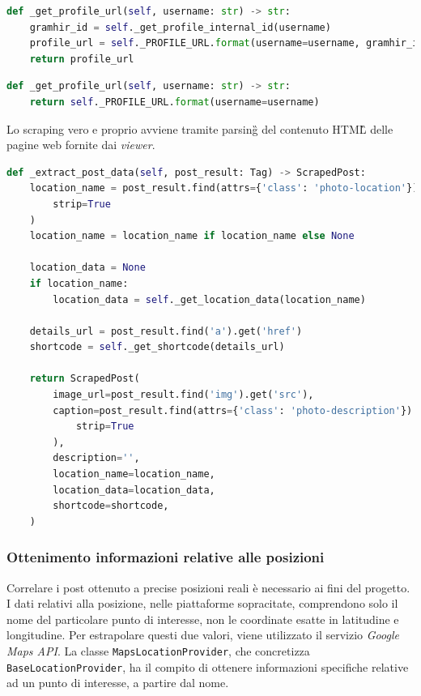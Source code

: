 \begin{lstlisting}[language=Python, caption=Ottenimento URL profilo in \textit{Gramhir}]
def _get_profile_url(self, username: str) -> str:
    gramhir_id = self._get_profile_internal_id(username)
    profile_url = self._PROFILE_URL.format(username=username, gramhir_id=gramhir_id)
    return profile_url
\end{lstlisting}

\begin{lstlisting}[language=Python, caption=Ottenimento URL profilo in \textit{Picuki}]
def _get_profile_url(self, username: str) -> str:
    return self._PROFILE_URL.format(username=username)
\end{lstlisting}

\aCapo{}
Lo scraping vero e proprio avviene tramite parsing\G{} del contenuto HTML\G{} delle pagine web
fornite dai \textit{viewer}.
\begin{lstlisting}[language=Python, caption=Estrazioni dati tramite parsing\G{}]
def _extract_post_data(self, post_result: Tag) -> ScrapedPost:
    location_name = post_result.find(attrs={'class': 'photo-location'}).get_text(
        strip=True
    )
    location_name = location_name if location_name else None

    location_data = None
    if location_name:
        location_data = self._get_location_data(location_name)

    details_url = post_result.find('a').get('href')
    shortcode = self._get_shortcode(details_url)

    return ScrapedPost(
        image_url=post_result.find('img').get('src'),
        caption=post_result.find(attrs={'class': 'photo-description'}).get_text(
            strip=True
        ),
        description='',
        location_name=location_name,
        location_data=location_data,
        shortcode=shortcode,
    )
\end{lstlisting}

\subsubsection{Ottenimento informazioni relative alle posizioni}
Correlare i post ottenuto a precise posizioni reali è necessario ai fini del progetto.
I dati relativi alla posizione, nelle piattaforme sopracitate, comprendono solo il nome del
particolare punto di interesse, non le coordinate esatte in latitudine e longitudine.
Per estrapolare questi due valori, viene utilizzato il servizio \textit{Google Maps API}.\aCapo{}
La classe \verb|MapsLocationProvider|, che concretizza \verb|BaseLocationProvider|, ha il compito
di ottenere informazioni specifiche relative ad un punto di interesse, a partire dal nome.

